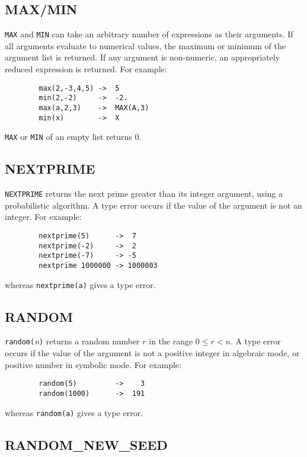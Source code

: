 \subsection{MAX/MIN}
\hypertarget{operator:MAX}{}
\hypertarget{operator:MIN}{}

\texttt{MAX} and \texttt{MIN} can take an arbitrary
number of expressions as their arguments.  If all arguments evaluate to
numerical values, the maximum or minimum of the argument list is returned.
If any argument is non-numeric, an appropriately reduced expression is
returned.  For example:
\begin{verbatim}
        max(2,-3,4,5) ->  5
        min(2,-2)     ->  -2.
        max(a,2,3)    ->  MAX(A,3)
        min(x)        ->  X
\end{verbatim}
\texttt{MAX} or \texttt{MIN} of an empty list returns 0.

\subsection{NEXTPRIME}
\hypertarget{operator:NEXTPRIME}{}

\texttt{NEXTPRIME} returns the next prime greater than its integer argument,
using a probabilistic algorithm.  A type error occurs if the value of the
argument is not an integer.  For example:
\begin{verbatim}
        nextprime(5)      ->  7
        nextprime(-2)     ->  2
        nextprime(-7)     -> -5
        nextprime 1000000 -> 1000003
\end{verbatim}
whereas \texttt{nextprime(a)} gives a type error.

\subsection{RANDOM}
\hypertarget{operator:RANDOM}{}

\texttt{random(}{\em n\/}\texttt{)} returns a random number $r$ in the
range $0\leq r < n$.  A type error occurs if the value of the argument is not a
positive integer in algebraic mode, or positive number in symbolic mode.
For example:
\begin{verbatim}
        random(5)         ->    3
        random(1000)      ->  191
\end{verbatim}
whereas \texttt{random(a)} gives a type error.

\subsection{RANDOM\_NEW\_SEED}
\hypertarget{operator:RANDOM_NEW_SEED}{}

